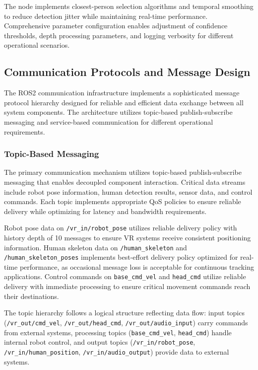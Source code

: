 The node implements closest-person selection algorithms and temporal smoothing to reduce detection jitter while maintaining real-time performance. Comprehensive parameter configuration enables adjustment of confidence thresholds, depth processing parameters, and logging verbosity for different operational scenarios.

\subsection{Communication Protocols and Message Design}

The ROS2 communication infrastructure implements a sophisticated message protocol hierarchy designed for reliable and efficient data exchange between all system components. The architecture utilizes topic-based publish-subscribe messaging and service-based communication for different operational requirements.

\subsubsection{Topic-Based Messaging}

The primary communication mechanism utilizes topic-based publish-subscribe messaging that enables decoupled component interaction. Critical data streams include robot pose information, human detection results, sensor data, and control commands. Each topic implements appropriate QoS policies to ensure reliable delivery while optimizing for latency and bandwidth requirements.

Robot pose data on \texttt{/vr\_in/robot\_pose} utilizes reliable delivery policy with history depth of 10 messages to ensure VR systems receive consistent positioning information. Human skeleton data on \texttt{/human\_skeleton} and \texttt{/human\_skeleton\_poses} implements best-effort delivery policy optimized for real-time performance, as occasional message loss is acceptable for continuous tracking applications. Control commands on \texttt{base\_cmd\_vel} and \texttt{head\_cmd} utilize reliable delivery with immediate processing to ensure critical movement commands reach their destinations.

The topic hierarchy follows a logical structure reflecting data flow: input topics (\texttt{/vr\_out/cmd\_vel}, \texttt{/vr\_out/head\_cmd}, \texttt{/vr\_out/audio\_input}) carry commands from external systems, processing topics (\texttt{base\_cmd\_vel}, \texttt{head\_cmd}) handle internal robot control, and output topics (\texttt{/vr\_in/robot\_pose}, \texttt{/vr\_in/human\_position}, \texttt{/vr\_in/audio\_output}) provide data to external systems.

